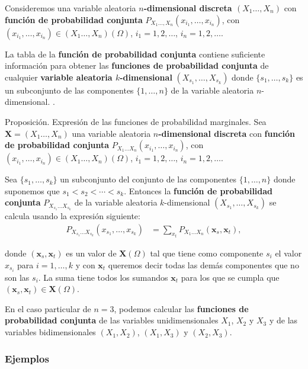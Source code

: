 \documentclass[]{book}
\begin{document}
Consideremos una variable aleatoria \textbf{\(n\)-dimensional discreta \((X_1\ldots,X_n)\)} con \textbf{función de probabilidad conjunta} \(P_{X_1\ldots,X_n}(x_{i_1},\ldots,x_{i_n})\), con \((x_{i_1},\ldots,x_{i_n})\in (X_1\ldots,X_n)(\Omega)\), \(i_1=1,2,\ldots\), \(i_n=1,2,\ldots\).

La tabla de la \textbf{función de probabilidad conjunta} contiene suficiente información para obtener las \textbf{funciones de probabilidad conjunta} de cualquier \textbf{variable aleatoria \(k\)-dimensional} \((X_{s_1},\ldots,X_{s_k})\) donde \(\{s_1,\ldots,s_k\}\) es un subconjunto de las componentes \(\{1,\ldots,n\}\) de la variable aleatoria \(n\)-dimensional. .

Proposición. Expresión de las funciones de probabilidad marginales.
Sea \(\mathbf{X}=(X_1\ldots,X_n)\) una variable aleatoria \textbf{\(n\)-dimensional discreta} con \textbf{función de probabilidad conjunta} \(P_{X_1\ldots X_n}(x_{i_1},\ldots,x_{i_n})\), con \((x_{i_1},\ldots,x_{i_n})\in (X_1\ldots,X_n)(\Omega)\), \(i_1=1,2,\ldots\), \(i_n=1,2,\ldots\).

Sea \(\{s_1,\ldots,s_k\}\) un subconjunto del conjunto de las componentes \(\{1,\ldots,n\}\) donde suponemos que \(s_1 < s_2<\cdots < s_k\). Entonces la \textbf{función de probabilidad conjunta} \(P_{X_{s_1}\ldots X_{s_k}}\) de la variable aleatoria \(k\)-dimensional \((X_{s_1},\ldots, X_{s_k})\) se calcula usando la expresión siguiente:
\[
\begin{array}{rl}
P_{X_{s_1}\ldots X_{s_k}}(x_{s_1},\ldots,x_{s_k})  & = \sum_{x_t} P_{X_1\ldots X_n}(\mathbf{x}_s,\mathbf{x}_t),
\end{array}
\]

donde \((\mathbf{x}_s,\mathbf{x}_t)\) es un valor de \(\mathbf{X}(\Omega)\) tal que tiene como componente \(s_i\) el valor \(x_{s_i}\) para \(i=1,\ldots, k\) y con \(\mathbf{x}_t\) queremos decir todas las demás componentes que no son las \(s_i\). La suma tiene todos los sumandos \(\mathbf{x}_t\) para los que se cumpla que \((\mathbf{x}_s,\mathbf{x}_t)\in \mathbf{X}(\Omega)\).

En el caso particular de \(n=3\), podemos calcular las \textbf{funciones de probabilidad conjunta} de las variables unidimensionales \(X_1\), \(X_2\) y \(X_3\) y de las variables bidimensionales \((X_1,X_2)\), \((X_1,X_3)\) y \((X_2,X_3)\).

\hypertarget{ejemplos-16}{%
\subsubsection{Ejemplos}\label{ejemplos-16}}
\end{document}
